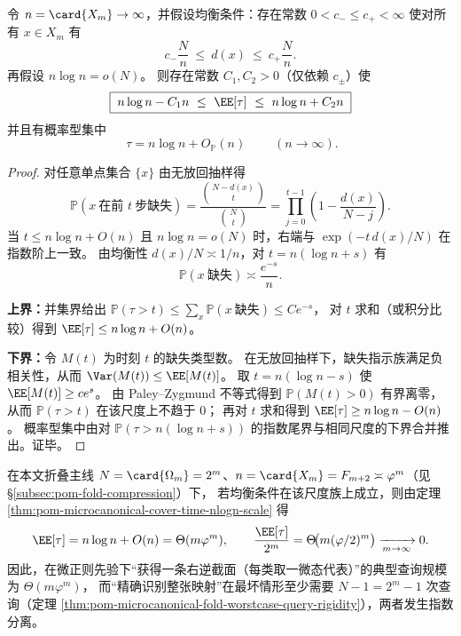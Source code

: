 \begin{theorem}\label{thm:pom-microcanonical-cover-time-nlogn-scale}
令 \(n=\card{X_m}\to\infty\)，并假设均衡条件：存在常数 \(0<c_-\le c_+<\infty\) 使对所有 \(x\in X_m\) 有
\[
c_-\frac{N}{n}\ \le\ d(x)\ \le\ c_+\frac{N}{n}.
\]
再假设 \(n\log n=o(N)\)。
则存在常数 \(C_1,C_2>0\)（仅依赖 \(c_\pm\)）使
\[
\boxed{\;
n\log n-C_1n\ \le\ \EE[\tau]\ \le\ n\log n+C_2n\;}
\]
并且有概率型集中
\[
\boxed{\;
\tau=n\log n+O_{\mathbb{P}}(n)\;}
\qquad(n\to\infty).
\]
\end{theorem}
\begin{proof}
对任意单点集合 \(\{x\}\) 由无放回抽样得
\[
\mathbb{P}(x\ \text{在前 }t\ \text{步缺失})
=\frac{\binom{N-d(x)}{t}}{\binom{N}{t}}
=\prod_{j=0}^{t-1}\left(1-\frac{d(x)}{N-j}\right).
\]
当 \(t\le n\log n+O(n)\) 且 \(n\log n=o(N)\) 时，右端与
\(\exp(-t\,d(x)/N)\) 在指数阶上一致。
由均衡性 \(d(x)/N\asymp 1/n\)，对 \(t=n(\log n+s)\) 有
\[
\mathbb{P}(x\ \text{缺失})\asymp \frac{e^{-s}}{n}.
\]
\par
\textbf{上界：}并集界给出 \(\mathbb{P}(\tau>t)\le\sum_{x}\mathbb{P}(x\ \text{缺失})\le C e^{-s}\)，
对 \(t\) 求和（或积分比较）得到 \(\EE[\tau]\le n\log n+O(n)\)。
\par
\textbf{下界：}令 \(M(t)\) 为时刻 \(t\) 的缺失类型数。
在无放回抽样下，缺失指示族满足负相关性，从而 \(\Var(M(t))\le \EE[M(t)]\)。
取 \(t=n(\log n-s)\) 使 \(\EE[M(t)]\ge c e^{s}\)。
由 Paley--Zygmund 不等式得到 \(\mathbb{P}(M(t)>0)\) 有界离零，
从而 \(\mathbb{P}(\tau>t)\) 在该尺度上不趋于 \(0\)；
再对 \(t\) 求和得到 \(\EE[\tau]\ge n\log n-O(n)\)。
概率型集中由对 \(\mathbb{P}(\tau>n(\log n+s))\) 的指数尾界与相同尺度的下界合并推出。证毕。
\end{proof}

\begin{corollary}\label{cor:pom-microcanonical-cover-time-fibonacci-separation}
在本文折叠主线 \(N=\card{\Omega_m}=2^m\)、\(n=\card{X_m}=F_{m+2}\asymp\varphi^m\)（见 \S\ref{subsec:pom-fold-compression}）下，
若均衡条件在该尺度族上成立，则由定理 \ref{thm:pom-microcanonical-cover-time-nlogn-scale} 得
\[
\EE[\tau]=n\log n+O(n)=\Theta(m\varphi^m),
\qquad
\frac{\EE[\tau]}{2^m}=\Theta\!\bigl(m(\varphi/2)^m\bigr)\xrightarrow[m\to\infty]{}0.
\]
因此，在微正则先验下“获得一条右逆截面（每类取一微态代表）”的典型查询规模为 \(\Theta(m\varphi^m)\)，
而“精确识别整张映射”在最坏情形至少需要 \(N-1=2^m-1\) 次查询（定理 \ref{thm:pom-microcanonical-fold-worstcase-query-rigidity}），两者发生指数分离。
\end{corollary}

